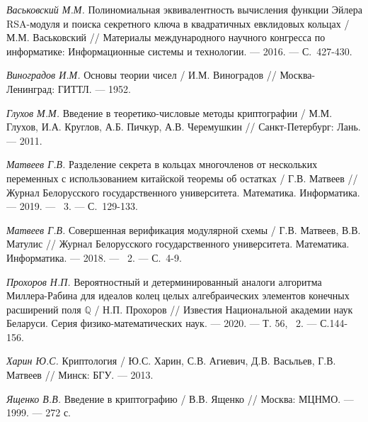 \begin{thebibliography}{99}
    \textit{Васьковский М.М.} Полиномиальная эквивалентность вычисления функции Эйлера RSA-модуля и поиска секретного ключа в квадратичных евклидовых кольцах / М.М. Васьковский // Материалы международного научного конгресса по информатике: Информационные системы и технологии. --- 2016. --- С.~427-430.

    \textit{Виноградов И.М.} Основы теории чисел / И.М. Виноградов // Москва-Ленинград: ГИТТЛ. --- 1952.

    \textit{Глухов М.М.} Введение в теоретико-числовые методы криптографии / М.М. Глухов, И.А. Круглов, А.Б. Пичкур, А.В. Черемушкин // Санкт-Петербург: Лань. --- 2011.
    
    \textit{Матвеев Г.В.} Разделение секрета в кольцах многочленов от нескольких переменных с использованием китайской теоремы об остатках / Г.В. Матвеев // Журнал Белорусского государственного университета. Математика. Информатика. --- 2019. --- \textnumero~3. --- С.~129-133.
    
    \textit{Матвеев Г.В.} Совершенная верификация модулярной схемы / Г.В. Матвеев, В.В. Матулис // Журнал Белорусского государственного университета. Математика. Информатика. --- 2018. --- \textnumero~2. --- С.~4-9.

    \textit{Прохоров Н.П.} Вероятностный и детерминированный аналоги алгоритма Миллера-Рабина для идеалов колец целых алгебраических элементов конечных расширений поля $\mathbb{Q}$ / Н.П. Прохоров // Известия Национальной академии наук Беларуси. Серия физико-математических наук. --- 2020. --- Т. 56, \textnumero~2. --- С.144-156.
    
    \textit{Харин Ю.С.} Криптология / Ю.С. Харин, С.В. Агиевич, Д.В. Васьльев, Г.В. Матвеев // Минск: БГУ. --- 2013.

    \textit{Ященко В.В.} Введение в криптографию / В.В. Ященко // Москва: МЦНМО. --- 1999. --- 272 с.

\end{thebibliography}



